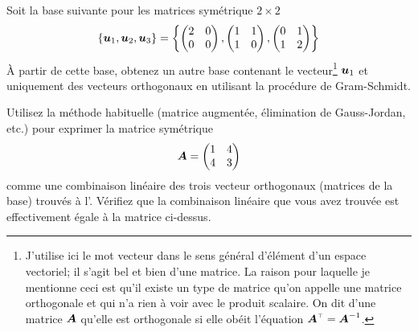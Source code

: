 \begin{exerciceB}\label{prob:orthog}
Soit la base suivante pour les matrices symétrique $2\times 2$
\[
\left\{\boldsymbol{u}_1, \boldsymbol{u}_2, \boldsymbol{u}_3 \right\} = \left\{ \begin{pmatrix}
2 & 0 \\
0 & 0
\end{pmatrix},
\begin{pmatrix}
1 & 1\\ 1 & 0
\end{pmatrix},
\begin{pmatrix}
0 & 1 \\
1 & 2
\end{pmatrix}
\right\}
\]
À partir de cette base, obtenez un autre base contenant le vecteur\footnote{J'utilise ici
le mot vecteur dans le sens général d'élément d'un espace vectoriel; 
il s'agit bel et bien d'une matrice.  La raison pour laquelle je mentionne
ceci est qu'il existe un type de matrice qu'on appelle une matrice orthogonale
et qui n'a rien à voir avec le produit scalaire. On dit d'une matrice $\boldsymbol{A}$
qu'elle est orthogonale si elle obéit l'équation $\transp{\matA}=\matA^{-1}$.} $\boldsymbol{u}_1$ et
uniquement des vecteurs orthogonaux en utilisant la procédure de Gram-Schmidt.
\end{exerciceB}
\begin{exerciceB}
Utilisez la méthode habituelle (matrice augmentée, élimination de Gauss-Jordan, etc.) 
pour exprimer la matrice symétrique 
\[
\boldsymbol{A} = \begin{pmatrix}
1 & 4 \\ 4 & 3
\end{pmatrix}
\]
comme une combinaison linéaire des trois vecteur orthogonaux (matrices de la base) trouvés à
l'.
 Vérifiez que la combinaison linéaire que vous avez trouvée est
effectivement égale à la matrice ci-dessus.
\end{exerciceB}

